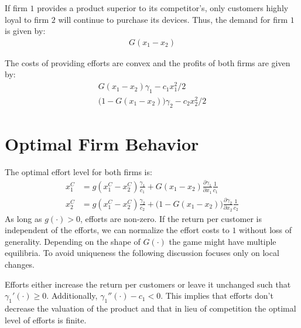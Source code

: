 \documentclass[a4paper, 11pt]{article}
\begin{document}
If firm $1$ provides a product superior to its competitor's, only customers highly loyal to firm $2$ will continue to purchase its devices. Thus, the demand for firm $1$ is given by:
\begin{align*}
G(x_1-x_2)
\end{align*}

The costs of providing efforts are convex and the profits of both firms are given by:
\begin{align}
G(x_1-x_2)\gamma_1 - c_1x_1^2/2\\
\big(1-G(x_1-x_2)\big)\gamma_2 - c_2x_2^2/2
\end{align}

\section{Optimal Firm Behavior}

The optimal effort level for both firms is:
\begin{align}
x_1^C &= g(x_1^C-x_2^C)\frac{\gamma_1}{c_1} + G(x_1-x_2)\frac{\partial \gamma_1}{\partial x_1}\frac{1}{c_1}\\
x_2^C &= g(x_1^C-x_2^C)\frac{\gamma_2}{c_2} + \big(1-G(x_1-x_2)\big)\frac{\partial \gamma_2}{\partial x_2}\frac{1}{c_2}
\end{align}
As long as $g(\cdot)>0$, efforts are non-zero. If the return per customer is independent of the efforts, we can normalize the effort costs to $1$ without loss of generality. Depending on the shape of $G(\cdot)$ the game might have multiple equilibria. To avoid uniqueness the following discussion focuses only on local changes. 

Efforts either increase the return per customers or leave it unchanged such that $\gamma_1'(\cdot)\geq 0$. Additionally, $\gamma_1''(\cdot) - c_1<0$. This implies that efforts don't decrease the valuation of the product and that in lieu of competition the optimal level of efforts is finite.
\end{document}
